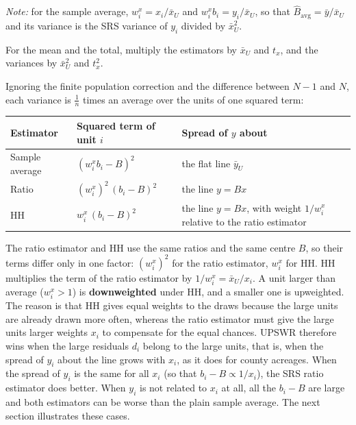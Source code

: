 \documentclass[
  letterpaper,
  DIV=11,
  numbers=noendperiod]{scrreprt}
\newcounter{none} %
\renewcommand{\[}{\begin{equation}}
\renewcommand{\]}{\end{equation}}
\begin{document}
\emph{Note:} for the sample average, \(w^x_i=x_i/\bar{x}_U\) and
\(w^x_ib_i=y_i/\bar{x}_U\), so that
\(\hat{B}_{\mathrm{avg}}=\bar{y}/\bar{x}_U\) and its variance is the SRS
variance of \(y_i\) divided by \(\bar{x}_U^2\).

For the mean and the total, multiply the estimators by \(\bar{x}_U\) and
\(t_x\), and the variances by \(\bar{x}_U^2\) and \(t_x^2\).

Ignoring the finite population correction and the difference between
\(N-1\) and \(N\), each variance is \(\frac1n\) times an average over
the units of one squared term:

{\def\LTcaptype{none} %
\begin{longtable}[]{@{}
  >{\raggedright\arraybackslash}p{}
  >{\raggedright\arraybackslash}p{}
  >{\raggedright\arraybackslash}p{}@{}}
\toprule\noalign{}
\begin{minipage}[b]{\linewidth}\raggedright
Estimator
\end{minipage} & \begin{minipage}[b]{\linewidth}\raggedright
Squared term of unit \(i\)
\end{minipage} & \begin{minipage}[b]{\linewidth}\raggedright
Spread of \(y\) about
\end{minipage} \\
\midrule\noalign{}
\endhead
\bottomrule\noalign{}
\endlastfoot
Sample average & \((w^x_ib_i-B)^2\) & the flat line \(\bar{y}_U\) \\
Ratio & \((w^x_i)^2\,(b_i-B)^2\) & the line \(y=Bx\) \\
HH & \(w^x_i\,(b_i-B)^2\) & the line \(y=Bx\), with weight \(1/w^x_i\)
relative to the ratio estimator \\
\end{longtable}
}

The ratio estimator and HH use the same ratios and the same centre
\(B\), so their terms differ only in one factor: \((w^x_i)^2\) for the
ratio estimator, \(w^x_i\) for HH. HH multiplies the term of the ratio
estimator by \(1/w^x_i=\bar{x}_U/x_i\). A unit larger than average
(\(w^x_i>1\)) is \textbf{downweighted} under HH, and a smaller one is
upweighted. The reason is that HH gives equal weights to the draws
because the large units are already drawn more often, whereas the ratio
estimator must give the large units larger weights \(x_i\) to compensate
for the equal chances. UPSWR therefore wins when the large residuals
\(d_i\) belong to the large units, that is, when the spread of \(y_i\)
about the line grows with \(x_i\), as it does for county acreages. When
the spread of \(y_i\) is the same for all \(x_i\) (so that
\(b_i-B\propto1/x_i\)), the SRS ratio estimator does better. When
\(y_i\) is not related to \(x_i\) at all, all the \(b_i-B\) are large
and both estimators can be worse than the plain sample average. The next
section illustrates these cases.
\end{document}
